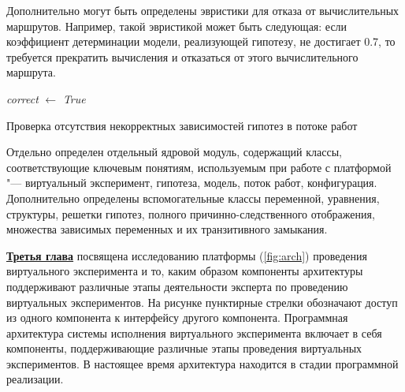 Дополнительно могут быть определены эвристики для отказа от вычислительных маршрутов. Например, такой эвристикой может 
быть следующая: если коэффициент детерминации модели, реализующей гипотезу, не достигает 0.7, то требуется прекратить
вычисления и отказаться от этого вычислительного маршрута.

\begin{algorithm}


    \textit{correct} $\gets$ \textit{True}

    \caption{Проверка отсутствия некорректных зависимостей гипотез в потоке работ}\label{alg:consistence}
\end{algorithm}

Отдельно определен отдельный ядровой модуль, содержащий классы, соответствующие ключевым понятиям, используемым при работе 
с платформой "--- виртуальный эксперимент, гипотеза, модель, поток работ, конфигурация. Дополнительно определены 
вспомогательные классы переменной, уравнения, структуры, решетки гипотез, полного причинно-следственного отображения, 
множества зависимых переменных и их транзитивного замыкания. 


\underline{\textbf{Третья глава}} посвящена исследованию платформы (\cref{fig:arch}) проведения виртуального 
эксперимента и то, каким образом компоненты архитектуры поддерживают различные этапы деятельности эксперта 
по проведению виртуальных экспериментов. На рисунке пунктирные стрелки обозначают доступ из одного компонента к интерфейсу другого компонента. Программная 
архитектура системы исполнения виртуального эксперимента включает в себя компоненты, поддерживающие различные этапы 
проведения виртуальных экспериментов. В настоящее время архитектура находится в стадии программной реализации.

